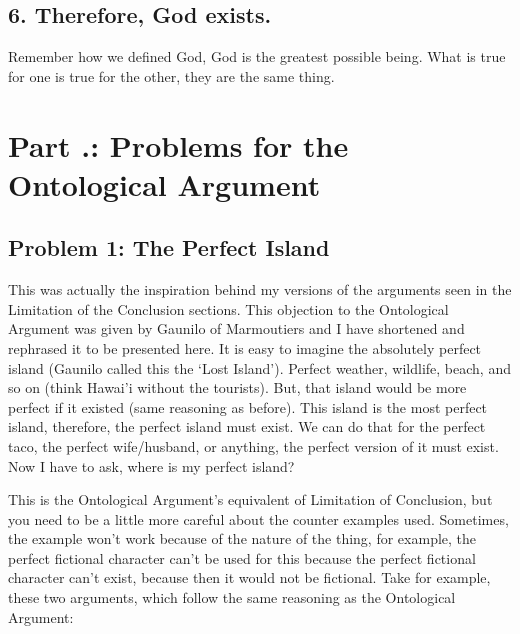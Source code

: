 \subsection{6. Therefore, God exists.}

Remember how we defined God, God is the greatest possible being. What is true for one is true for the other, they are the same thing.

\section{Part \thechapcount.\theseccount: Problems for the Ontological Argument}
\subsection{Problem 1: The Perfect Island}

This was actually the inspiration behind my versions of the arguments seen in the Limitation of the Conclusion sections. This objection to the Ontological Argument was given by Gaunilo of Marmoutiers and I have shortened and rephrased it to be presented here. It is easy to imagine the absolutely perfect island (Gaunilo called this the `Lost Island'). Perfect weather, wildlife, beach, and so on (think Hawai’i without the tourists). But, that island would be more perfect if it existed (same reasoning as before). This island is the most perfect island, therefore, the perfect island must exist.\autocite[p. 163]{Anselm2} We can do that for the perfect taco, the perfect wife/husband, or anything, the perfect version of it must exist. Now I have to ask, where is my perfect island?

This is the Ontological Argument's equivalent of Limitation of Conclusion, but you need to be a little more careful about the counter examples used.  Sometimes, the example won't work because of the nature of the thing, for example, the perfect fictional character can't be used for this because the perfect fictional character can't exist, because then it would not be fictional. Take for example, these two arguments, which follow the same reasoning as the Ontological Argument:


